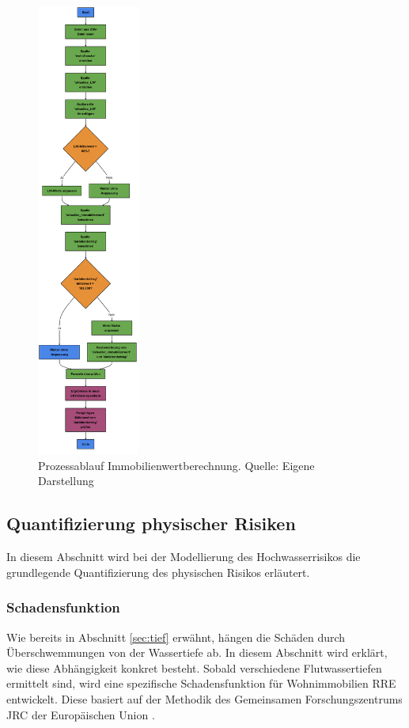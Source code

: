 \begin{figure}[H]
    \centering
    \includegraphics[width=0.3\textwidth]{figures/flowchardatatensatz.png}
    \caption{Prozessablauf Immobilienwertberechnung. Quelle: Eigene Darstellung}
    \label{fig:flowchart}
\end{figure}

\subsection{Quantifizierung physischer Risiken}
In diesem Abschnitt wird bei der Modellierung des Hochwasserrisikos die grundlegende Quantifizierung des physischen Risikos erläutert.

\subsubsection{Schadensfunktion}\label{sec:schadenfkt}
Wie bereits in Abschnitt \ref{sec:tief} erwähnt, hängen die Schäden durch Überschwemmungen von der Wassertiefe ab. In diesem Abschnitt wird erklärt, wie diese Abhängigkeit konkret besteht.
Sobald verschiedene Flutwassertiefen ermittelt sind, wird eine spezifische Schadensfunktion für Wohnimmobilien \acs{RRE} entwickelt. Diese basiert auf der Methodik des Gemeinsamen Forschungszentrums \acs{JRC} der Europäischen Union \parencite{huizinga2017global}.

